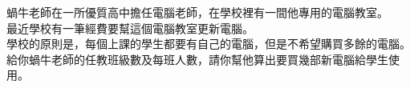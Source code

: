 蝸牛老師在一所優質高中擔任電腦老師，在學校裡有一間他專用的電腦教室。\\
最近學校有一筆經費要幫這個電腦教室更新電腦。\\
學校的原則是，每個上課的學生都要有自己的電腦，但是不希望購買多餘的電腦。\\
給你蝸牛老師的任教班級數及每班人數，請你幫他算出要買幾部新電腦給學生使用。\\
